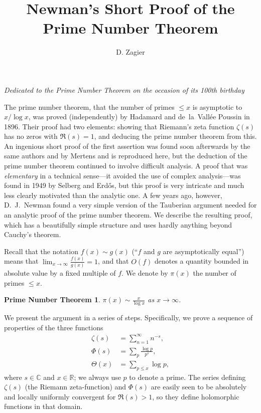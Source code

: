 \documentclass{article}
\newtheorem*{pntheorem}{Prime Number Theorem}
\begin{document}
\title{Newman's Short Proof of the Prime Number Theorem}
\author{D. Zagier}
\date{}
\maketitle
\begin{center}\textit{Dedicated to the Prime Number Theorem on the occasion of its 100th birthday}\end{center}

The prime number theorem, that the number of primes $\le x$ is asymptotic to $x/\log x$, was proved (independently) by Hadamard and de~la~Vall\'ee Poussin in 1896. Their proof had two elements: showing that Riemann's zeta function $\zeta(s)$ has no zeros with $\Re(s)=1$, and deducing the prime number theorem from this. An ingenious short proof of the first assertion was found soon afterwards by the same authors and by Mertens and is reproduced here, but the deduction of the prime number theorem continued to involve difficult analysis. A proof that was \textit{elementary} in a technical sense---it avoided the use of complex analysis---was found in 1949 by Selberg and Erd\H{o}s, but this proof is very intricate and much less clearly motivated than the analytic one. A few years ago, however, D.~J.~Newman found a very simple version of the Tauberian argument needed for an analytic proof of the prime number theorem. We describe the resulting proof, which has a beautifully simple structure and uses hardly anything beyond Cauchy's theorem.

Recall that the notation $f(x)\sim g(x)$ (``$f$ and $g$ are asymptotically equal'') means that $\displaystyle\lim_{x\to\infty}\frac{f(x)}{g(x)}=1$, and that $O(f)$ denotes a quantity bounded in absolute value by a fixed multiple of $f$. We denote by $\pi(x)$ the number of primes $\le x$.

\begin{pntheorem}
$\pi(x)\sim \frac{x}{\log x}$ as $x\to\infty$.
\end{pntheorem}

We present the argument in a series of steps. Specifically, we prove a sequence of properties of the three functions
\begin{align*}
\zeta(s)&=\sum_{n=1}^{\infty} n^{-s},\\
\Phi(s)&=\sum_{p}\frac{\log p}{p^s},\\
\Theta(x)&=\sum_{p\le x}\log p,
\end{align*}
where $s\in\mathbb{C}$ and $x\in\mathbb{R}$; we always use $p$ to denote a prime. The series defining $\zeta(s)$ (the Riemann zeta-function) and $\Phi(s)$ are easily seen to be absolutely and locally uniformly convergent for $\Re(s)>1$, so they define holomorphic functions in that domain.
\end{document}
